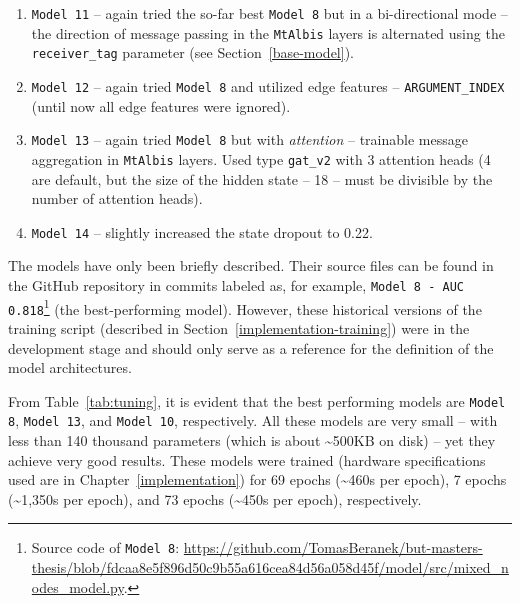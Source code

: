 \begin{enumerate}
    \item \texttt{Model 11} -- again tried the so-far best \texttt{Model 8} but in a bi-directional mode -- the direction of message passing in the \texttt{MtAlbis} layers is alternated using the \texttt{receiver\_tag} parameter (see Section~\ref{base-model}).
    \item \texttt{Model 12} -- again tried \texttt{Model 8} and utilized edge features -- \texttt{ARGUMENT\_INDEX} (until now all edge features were ignored).
    \item \texttt{Model 13} -- again tried \texttt{Model 8} but with \textit{attention} -- trainable message aggregation in \texttt{MtAlbis} layers. Used type \texttt{gat\_v2} with 3 attention heads (4 are default, but the size of the hidden state -- 18 -- must be divisible by the number of attention heads).
    \item \texttt{Model 14} -- slightly increased the state dropout to 0.22.
\end{enumerate}

The models have only been briefly described. Their source files can be found in the GitHub repository in commits labeled as, for example, \texttt{Model 8 - AUC 0.818}\footnote{Source code of \texttt{Model 8}: \url{https://github.com/TomasBeranek/but-masters-thesis/blob/fdcaa8e5f896d50c9b55a616cea84d56a058d45f/model/src/mixed_nodes_model.py}.} (the best-performing model). However, these historical versions of the training script (described in Section~\ref{implementation-training}) were in the development stage and should only serve as a reference for the definition of the model architectures.

From Table~\ref{tab:tuning}, it is evident that the best performing models are \texttt{Model 8}, \texttt{Model 13}, and \texttt{Model 10}, respectively. All these models are very small -- with less than 140 thousand parameters (which is about \textasciitilde500KB on disk) -- yet they achieve very good results. These models were trained (hardware specifications used are in Chapter~\ref{implementation}) for 69 epochs (\textasciitilde460s per epoch), 7 epochs (\textasciitilde1,350s per epoch), and 73 epochs (\textasciitilde450s per epoch), respectively.

